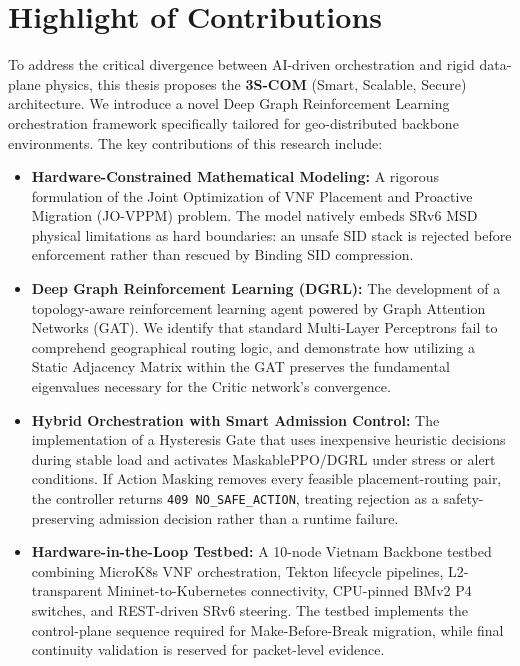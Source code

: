 \documentclass[12pt, a4paper, reqno, oneside]{book}
\begin{document}
\section{Highlight of Contributions}
To address the critical divergence between AI-driven orchestration and rigid data-plane physics, this thesis proposes the \textbf{3S-COM} (Smart, Scalable, Secure) architecture. We introduce a novel Deep Graph Reinforcement Learning orchestration framework specifically tailored for geo-distributed backbone environments. The key contributions of this research include:

\begin{itemize}
    \item \textbf{Hardware-Constrained Mathematical Modeling:} A rigorous formulation of the Joint Optimization of VNF Placement and Proactive Migration (JO-VPPM) problem. The model natively embeds SRv6 MSD physical limitations as hard boundaries: an unsafe SID stack is rejected before enforcement rather than rescued by Binding SID compression.
    \item \textbf{Deep Graph Reinforcement Learning (DGRL):} The development of a topology-aware reinforcement learning agent powered by Graph Attention Networks (GAT). We identify that standard Multi-Layer Perceptrons fail to comprehend geographical routing logic, and demonstrate how utilizing a Static Adjacency Matrix within the GAT preserves the fundamental eigenvalues necessary for the Critic network's convergence.
    \item \textbf{Hybrid Orchestration with Smart Admission Control:} The implementation of a Hysteresis Gate that uses inexpensive heuristic decisions during stable load and activates MaskablePPO/DGRL under stress or alert conditions. If Action Masking removes every feasible placement-routing pair, the controller returns \texttt{409 NO\_SAFE\_ACTION}, treating rejection as a safety-preserving admission decision rather than a runtime failure.
    \item \textbf{Hardware-in-the-Loop Testbed:} A 10-node Vietnam Backbone testbed combining MicroK8s VNF orchestration, Tekton lifecycle pipelines, L2-transparent Mininet-to-Kubernetes connectivity, CPU-pinned BMv2 P4 switches, and REST-driven SRv6 steering. The testbed implements the control-plane sequence required for Make-Before-Break migration, while final continuity validation is reserved for packet-level evidence.
\end{itemize}
\end{document}
